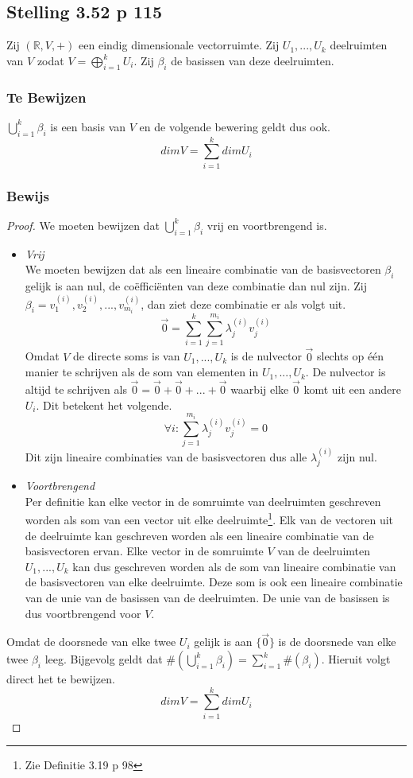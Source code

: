\documentclass[lineaire_algebra_oplossingen.tex]{subfiles}
\begin{document}
\subsection{Stelling 3.52 p 115}
\label{3.52}
Zij $(\mathbb{R},V,+)$ een eindig dimensionale vectorruimte. Zij $U_1,...,U_k$ deelruimten van $V$ zodat $V=\bigoplus_{i=1}^kU_i$. Zij $\beta_i$ de basissen van deze deelruimten.

\subsubsection*{Te Bewijzen}
$\bigcup_{i=1}^k\beta_i$ is een basis van $V$ en de volgende bewering geldt dus ook.
\[
dimV = \sum_{i=1}^kdimU_i
\]

\subsubsection*{Bewijs}
\begin{proof}
We moeten bewijzen dat $\bigcup_{i=1}^k\beta_i$ vrij en voortbrengend is.
\begin{itemize}
\item \emph{Vrij}\\
We moeten bewijzen dat als een lineaire combinatie van de basisvectoren $\beta_i$ gelijk is aan nul, de co\"effici\"enten van deze combinatie dan nul zijn. Zij $\beta_i = {v_1^{(i)},v_2^{(i)},...,v_{m_i}^{(i)}}$, dan ziet deze combinatie er als volgt uit.
\[
\vec{0} = \sum_{i=1}^k\sum_{j=1}^{m_i}\lambda_j^{(i)}v_j^{(i)}
\]
Omdat $V$ de directe soms is van $U_1,...,U_k$ is de nulvector $\vec{0}$ slechts op \'e\'en manier te schrijven als de som van elementen in $U_1,...,U_k$. De nulvector is altijd te schrijven als $\vec{0} = \vec{0} + \vec{0} + ... + \vec{0}$ waarbij elke $\vec{0}$ komt uit een andere $U_i$. Dit betekent het volgende.
\[
\forall i: \sum_{j=1}^{m_i}\lambda_j^{(i)}v_j^{(i)} = 0
\]
Dit zijn lineaire combinaties van de basisvectoren dus alle $\lambda_j^{(i)}$ zijn nul.
\item \emph{Voortbrengend}\\
Per definitie kan elke vector in de somruimte van deelruimten geschreven worden als som van een vector uit elke deelruimte\footnote{Zie Definitie 3.19 p 98}.
Elk van de vectoren uit de deelruimte kan geschreven worden als een lineaire combinatie van de basisvectoren ervan. Elke vector in de somruimte $V$ van de deelruimten $U_1,...,U_k$ kan dus geschreven worden als de som van lineaire combinatie van de basisvectoren van elke deelruimte. Deze som is ook een lineaire combinatie van de unie van de basissen van de deelruimten. De unie van de basissen is dus voortbrengend voor $V$.
\end{itemize}
Omdat de doorsnede van elke twee $U_i$ gelijk is aan $\{\vec{0}\}$ is de doorsnede van elke twee $\beta_i$ leeg. Bijgevolg geldt dat $\#(\bigcup_{i=1}^k\beta_i) = \sum_{i=1}^k\#(\beta_i)$. Hieruit volgt direct het te bewijzen.
\[
dimV = \sum_{i=1}^kdimU_i
\]
\end{proof}
\end{document}
